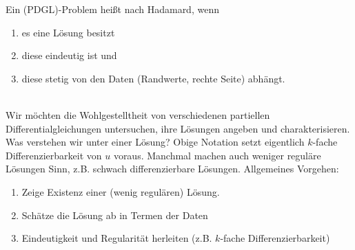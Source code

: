 \begin{defn}
\label{def_wohlgestellt}
	Ein (PDGL)-Problem heißt  nach Hadamard, wenn
	\begin{enumerate}[(1)]
		\item es eine Lösung besitzt
		\item diese eindeutig ist und
		\item diese stetig von den Daten (Randwerte, rechte Seite) abhängt.
	\end{enumerate}
\end{defn}
	
\mbox{} \\ Wir möchten die Wohlgestelltheit von verschiedenen partiellen Differentialgleichungen untersuchen, ihre Lösungen angeben und charakterisieren. Was verstehen wir unter einer Lösung? Obige Notation setzt eigentlich $k$-fache Differenzierbarkeit von $u$ voraus. Manchmal machen auch weniger reguläre Lösungen Sinn, z.B. schwach differenzierbare Lösungen. Allgemeines Vorgehen:
\begin{enumerate}[(1)]
	\item Zeige Existenz einer (wenig regulären) Lösung.
	\item Schätze die Lösung ab in Termen der Daten
	\item Eindeutigkeit und Regularität herleiten (z.B. $k$-fache Differenzierbarkeit)
\end{enumerate}
\newpage